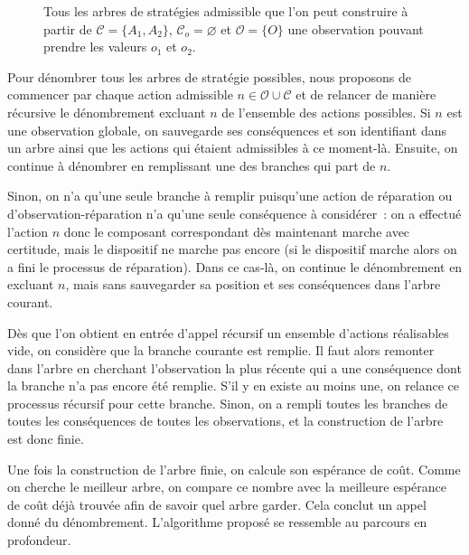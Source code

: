 \documentclass[a4paper,11pt]{article}
\theoremstyle{plain}
\theoremstyle{definition}
\begin{document}
\begin{figure}[ht]
\begin{subfigure}{.5\textwidth}
    \end{subfigure}

\caption{Tous les arbres de stratégies admissible que l'on peut construire à partir de $\mathcal C = \{A_1, A_2\}$, $\mathcal C_o = \varnothing$ et $\mathcal O = \{O\}$ une observation pouvant prendre les valeurs $o_1$ et $o_2$.}
\label{arbresDeStrategies}
\end{figure}

Pour dénombrer tous les arbres de stratégie possibles, nous proposons de commencer par chaque action admissible $n \in \mathcal O \cup \mathcal C$ et de relancer de manière récursive le dénombrement excluant $n$ de l'ensemble des actions possibles. Si $n$ est une observation globale, on sauvegarde ses conséquences et son identifiant dans un arbre ainsi que les actions qui étaient admissibles à ce moment-là. Ensuite, on continue à dénombrer en remplissant une des branches qui part de $n$.

Sinon, on n'a qu'une seule branche à remplir puisqu'une action de réparation ou d'observation-réparation n'a qu'une seule conséquence à considérer~: on a effectué l'action $n$ donc le composant correspondant dès maintenant marche avec certitude, mais le dispositif ne marche pas encore (si le dispositif marche alors on a fini le processus de réparation). Dans ce cas-là, on continue le dénombrement en excluant $n$, mais sans sauvegarder sa position et ses conséquences dans l'arbre courant.

Dès que l'on obtient en entrée d'appel récursif un ensemble d'actions réalisables vide, on considère que la branche courante est remplie. Il faut alors remonter dans l'arbre en cherchant l'observation la plus récente qui a une conséquence dont la branche n'a pas encore été remplie. S'il y en existe au moins une, on relance ce processus récursif pour cette branche. Sinon, on a rempli toutes les branches de toutes les conséquences de toutes les observations, et la construction de l'arbre est donc finie.

Une fois la construction de l'arbre finie, on calcule son espérance de coût. Comme on cherche le meilleur arbre, on compare ce nombre avec la meilleure espérance de coût déjà trouvée afin de savoir quel arbre garder. Cela conclut un appel donné du dénombrement. L'algorithme proposé se ressemble au parcours en profondeur.

\end{document}
